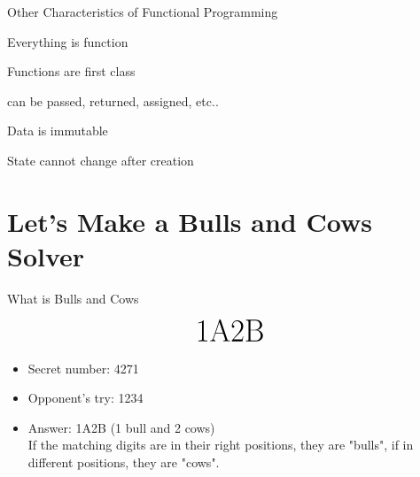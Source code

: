 \documentclass[10pt]{beamer}
\begin{document}
\begin{frame}{Other Characteristics of Functional Programming}

{\Huge Everything is function}

\pause
\large
Functions are first class

\pause
can be passed, returned, assigned, etc..

\bigskip 
\pause
{\Huge Data is immutable}

\pause
State cannot change after creation
    
\end{frame}




\section{Let's Make a Bulls and Cows Solver}

\begin{frame}{What is Bulls and Cows}

\[\text{{\Huge 1A2B}}\]

\begin{itemize}
    \item Secret number: 4271
    \item Opponent's try: 1234
    \item Answer: 1A2B (1 bull and 2 cows)\\If the matching digits are in their right positions, they are "bulls", if in different positions, they are "cows".
\end{itemize}

\end{frame}
\end{document}
